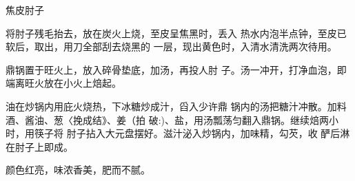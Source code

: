 \begin{recipe}{焦皮肘子}

\ingredients



\cooking

\step 	将肘子残毛抬去，放在炭火上烧，至皮呈焦黑时，丢入 热水内泡半点钟，至皮已软后，取出，用刀全部刮去烧黑的 一层，现出黄色时，入清水清洗两次待用。

\step 	鼎锅置于旺火上，放入碎骨垫底，加汤，再投人肘 子。汤一冲开，打净血泡，即端离旺火放在小火上焙起。

油在炒锅内用庇火烧热，下冰糖炒成汁，舀入少许鼎 锅内的汤把糖汁冲散。加料酒、酱油、葱〈挽成结》、姜（拍 破:)、盐，用汤瓢荡匀翻入鼎锅。继续焙两小时，用筷子将 肘子拈入大元盘摆好。滋汁泌入炒锅内，加味精，勾芡，收 酽后淋在肘子上即成。

\notes

颜色红亮，味浓香美，肥而不腻。

\end{recipe}

